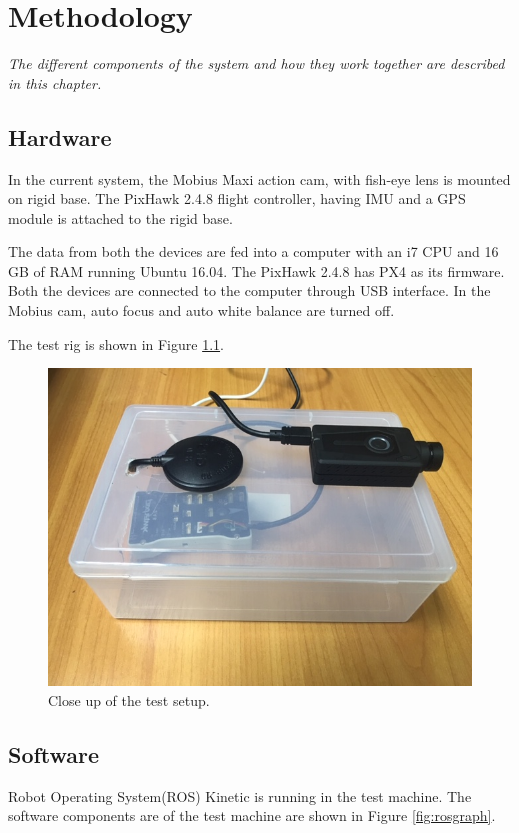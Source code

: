 \setlength{\footskip}{8mm}

\chapter{Methodology}
\label{ch:methodology}

\textit{The different components of the system and how they work together are described in this chapter.}

\section{Hardware}

In the current system, the Mobius Maxi action cam, with fish-eye lens is mounted on  rigid base. The PixHawk 2.4.8 flight controller, having IMU and a GPS module is attached to the rigid base. 


The data from both the devices are fed into a computer with an i7 CPU and 16 GB of RAM running Ubuntu 16.04. The PixHawk 2.4.8 has PX4 as its firmware. Both the devices are connected to the computer through USB interface. In the Mobius cam, auto focus and auto white balance are turned off. 

The test rig is shown in Figure \ref{fig:rigsetup}.

\begin{figure}
	\centering
	\includegraphics[width=5in]{figures/rig}
	\caption[Close up of the test setup.]{\small 
		Close up of the test setup. }
		\label{fig:rigsetup}
\end{figure}


\section{Software}
Robot Operating System(ROS) Kinetic is running in the test machine. 
The software components are of the test machine are shown in Figure \ref{fig:rosgraph}.

